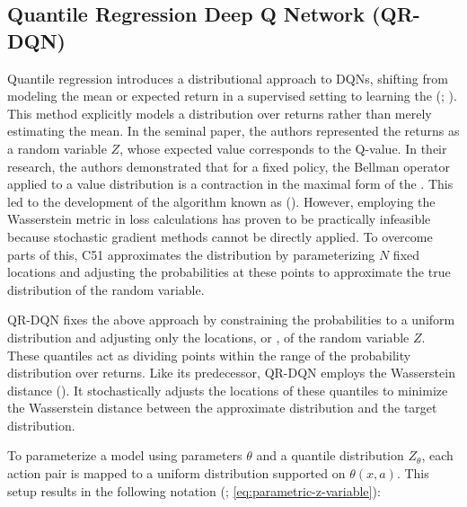 \subsection{Quantile Regression Deep Q Network (QR-DQN)}
\label{sec:qrdqn}


\noindent Quantile regression introduces a distributional approach to DQNs, shifting from modeling the mean or expected return in a supervised setting to learning the  (\textcolor{deepblue}{\cite{dabney2017distributional}; \cite{stable-baselines3}}). This method explicitly models a distribution over returns rather than merely estimating the mean. In the seminal paper, the authors represented the returns as a random variable $Z$, whose expected value corresponds to the Q-value. In their research, the authors demonstrated that for a fixed policy, the Bellman operator applied to a value distribution is a contraction in the maximal form of the . This led to the development of the algorithm known as  (\textcolor{deepblue}{\cite{bellemare2017distributional}}). However, employing the Wasserstein metric in loss calculations has proven to be practically infeasible because stochastic gradient methods cannot be directly applied. To overcome parts of this, C51 approximates the distribution by parameterizing $N$ fixed locations and adjusting the probabilities at these points to approximate the true distribution of the random variable. 

\bigskip


\noindent QR-DQN fixes the above approach by constraining the probabilities to a uniform distribution and adjusting only the locations, or , of the random variable $Z$. These quantiles act as dividing points within the range of the probability distribution over returns. Like its predecessor, QR-DQN employs the Wasserstein distance (\textcolor{deepblue}{\cite{dabney2017distributional}}). It stochastically adjusts the locations of these quantiles to minimize the Wasserstein distance between the approximate distribution and the target distribution.

\bigskip

\noindent To parameterize a model using parameters $\theta$ and a quantile distribution $Z_\theta$, each action pair is mapped to a uniform distribution supported on ${\theta(x,a)}$. This setup results in the following notation (\textcolor{deepblue}{\cite{dabney2017distributional}; \autoref{eq:parametric-z-variable}}):

